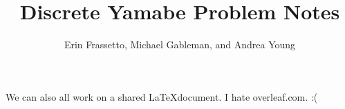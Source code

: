\documentclass{amsart}%
\title{Discrete Yamabe Problem Notes}
\author{Erin Frassetto, Michael Gableman, and Andrea Young}
\numberwithin{equation}{section}
\numberwithin{theorem}{section}
\begin{document}
\maketitle

We can also all work on a shared \LaTeX document.  I hate overleaf.com.  :(
\end{document}
